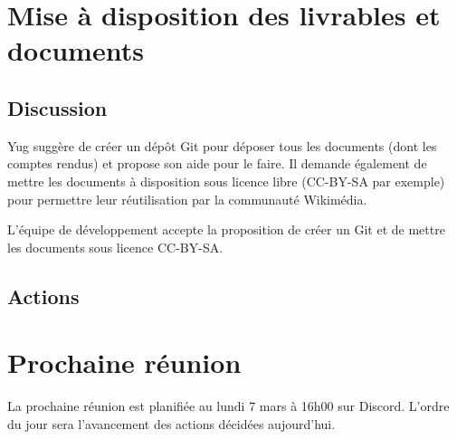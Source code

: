 \documentclass{article}
\begin{document}
\section{Mise à disposition des livrables et documents}

\subsection{Discussion}

Yug suggère de créer un dépôt Git pour déposer tous les documents (dont les comptes rendus) et propose son aide pour le faire. Il demande également de mettre les documents à disposition sous licence libre (CC-BY-SA par exemple) pour permettre leur réutilisation par la communauté Wikimédia.

L'équipe de développement accepte la proposition de créer un Git et de mettre les documents sous licence CC-BY-SA.

\subsection{Actions}

\begin{actionlist}
\end{actionlist}


\section{Prochaine réunion}

La prochaine réunion est planifiée au lundi 7 mars à 16h00 sur Discord. L'ordre du jour sera l'avancement des actions décidées aujourd'hui.
\end{document}
